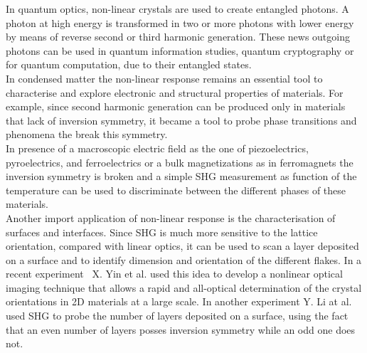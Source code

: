   
In quantum optics, non-linear crystals are used to create entangled photons. A photon at high energy is transformed in two or more photons with lower energy by means of reverse second or third harmonic generation. These news outgoing photons can be used in quantum information studies, quantum cryptography or for quantum computation, due to their entangled states.\cite{PhysRevLett.75.4337}\\ 
In condensed matter the non-linear response remains an essential tool to characterise and explore electronic and structural properties of materials. 
For example, since second harmonic generation can be produced only in materials that lack of inversion symmetry, it became a tool to probe phase transitions and phenomena the break this symmetry. \\
In presence of a macroscopic electric field as the one of piezoelectrics, pyroelectrics, and ferroelectrics or a bulk magnetizations as in ferromagnets the inversion symmetry is broken and a simple SHG measurement as function of the temperature can be used to discriminate between the different phases of these materials.\\ %
Another import application of non-linear response is the characterisation of surfaces and interfaces. Since SHG is much more sensitive to the lattice orientation, compared with linear optics, it can be used to scan a layer deposited on a surface and to identify  dimension and orientation of the different flakes. 
In a recent experiment~\cite{yin2014edge}  X. Yin et al. used this idea to develop a nonlinear optical imaging technique that allows a rapid and all-optical determination of the crystal orientations in 2D materials at a large scale. %
In another experiment Y. Li at al. used SHG to probe the number of layers deposited on a surface, using the fact that an even number of layers posses inversion symmetry while an odd one does not.\cite{doi:10.1021/nl401561r}\\
